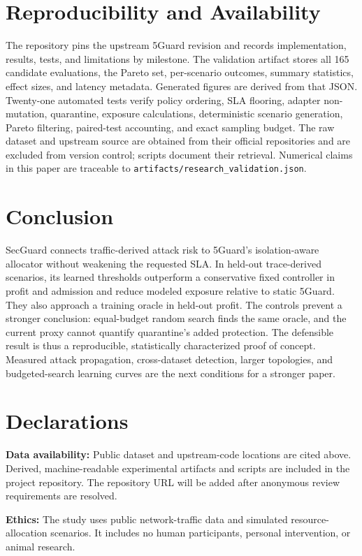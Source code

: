 \documentclass[conference]{IEEEtran}
\begin{document}
\section{Reproducibility and Availability}
The repository pins the upstream 5Guard revision and records implementation,
results, tests, and limitations by milestone. The validation artifact stores all
165 candidate evaluations, the Pareto set, per-scenario outcomes, summary
statistics, effect sizes, and latency metadata. Generated figures are derived
from that JSON. Twenty-one automated tests verify policy ordering, SLA flooring,
adapter non-mutation, quarantine, exposure calculations, deterministic scenario
generation, Pareto filtering, paired-test accounting, and exact sampling budget.
The raw dataset and upstream source are obtained from their official
repositories \cite{fiveguardcode,open5gsdataset} and are excluded from version
control; scripts document their retrieval. Numerical claims in this paper are
traceable to \texttt{artifacts/research\_validation.json}.

\section{Conclusion}
SecGuard connects traffic-derived attack risk to 5Guard's isolation-aware
allocator without weakening the requested SLA. In held-out trace-derived
scenarios, its learned thresholds outperform a conservative fixed controller in
profit and admission and reduce modeled exposure relative to static 5Guard.
They also approach a training oracle in held-out profit. The controls prevent a
stronger conclusion: equal-budget random search finds the same oracle, and the
current proxy cannot quantify quarantine's added protection. The defensible
result is thus a reproducible, statistically characterized proof of concept.
Measured attack propagation, cross-dataset detection, larger topologies, and
budgeted-search learning curves are the next conditions for a stronger paper.

\section*{Declarations}
\textbf{Data availability:} Public dataset and upstream-code locations are
cited above. Derived, machine-readable experimental artifacts and scripts are
included in the project repository. The repository URL will be added after
anonymous review requirements are resolved.

\textbf{Ethics:} The study uses public network-traffic data and simulated
resource-allocation scenarios. It includes no human participants, personal
intervention, or animal research.
\end{document}
